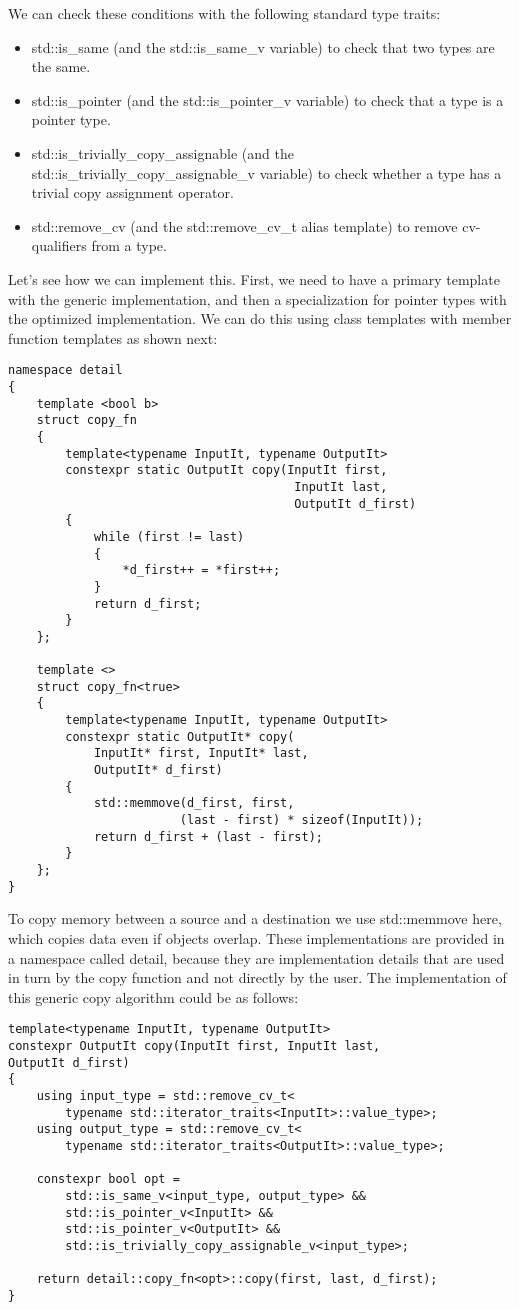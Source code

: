 We can check these conditions with the following standard type traits:

\begin{itemize}
\item
std::is\_same (and the std::is\_same\_v variable) to check that two types are the same.

\item
std::is\_pointer (and the std::is\_pointer\_v variable) to check that a type is a pointer type.

\item
std::is\_trivially\_copy\_assignable (and the std::is\_trivially\_copy\_assignable\_v variable) to check whether a type has a trivial copy assignment operator.

\item
std::remove\_cv (and the std::remove\_cv\_t alias template) to remove cv-qualifiers from a type.
\end{itemize}

Let’s see how we can implement this. First, we need to have a primary template with the generic implementation, and then a specialization for pointer types with the optimized implementation. We can do this using class templates with member function templates as shown next:

\begin{lstlisting}[style=styleCXX]
namespace detail
{
	template <bool b>
	struct copy_fn
	{
		template<typename InputIt, typename OutputIt>
		constexpr static OutputIt copy(InputIt first,
										InputIt last,
										OutputIt d_first)
		{
			while (first != last)
			{
				*d_first++ = *first++;
			}
			return d_first;
		}
	};

	template <>
	struct copy_fn<true>
	{
		template<typename InputIt, typename OutputIt>
		constexpr static OutputIt* copy(
			InputIt* first, InputIt* last,
			OutputIt* d_first)
		{
			std::memmove(d_first, first,
						(last - first) * sizeof(InputIt));
			return d_first + (last - first);
		}
	};
}
\end{lstlisting}

To copy memory between a source and a destination we use std::memmove here, which copies data even if objects overlap. These implementations are provided in a namespace called detail, because they are implementation details that are used in turn by the copy function and not directly by the user. The implementation of this generic copy algorithm could be as follows:

\begin{lstlisting}[style=styleCXX]
template<typename InputIt, typename OutputIt>
constexpr OutputIt copy(InputIt first, InputIt last,
OutputIt d_first)
{
	using input_type = std::remove_cv_t<
		typename std::iterator_traits<InputIt>::value_type>;
	using output_type = std::remove_cv_t<
		typename std::iterator_traits<OutputIt>::value_type>;
		
	constexpr bool opt =
		std::is_same_v<input_type, output_type> &&
		std::is_pointer_v<InputIt> &&
		std::is_pointer_v<OutputIt> &&
		std::is_trivially_copy_assignable_v<input_type>;
		
	return detail::copy_fn<opt>::copy(first, last, d_first);
}
\end{lstlisting}

